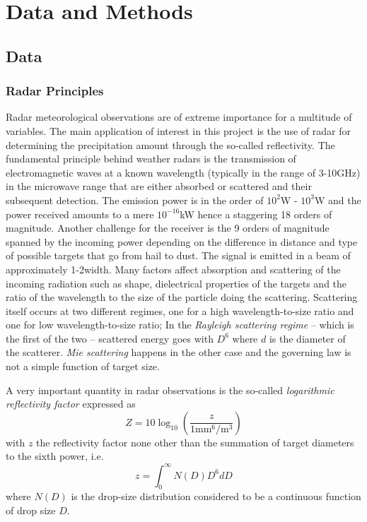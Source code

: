 \chapter{Data and Methods}\label{chap2}
\thispagestyle{plain}


\section{Data}\label{2sec:1}
\subsection{Radar Principles}
Radar meteorological observations are of extreme importance for a multitude of variables. The main application of interest in this project is the use of radar for determining the precipitation amount through the so-called reflectivity.
The fundamental principle behind weather radars is the transmission of electromagnetic waves at a known wavelength (typically in the range of 3-10GHz) in the microwave range that are either absorbed or scattered and their subsequent detection. The emission power is in the order of $10^2$W - $10^3$W and the power received amounts to a mere $10^{-16}$kW hence a staggering 18 orders of magnitude. Another challenge for the receiver is the 9 orders of magnitude spanned by the incoming power depending on the difference in distance and type of possible targets that go from hail to dust.
The signal is emitted in a beam of approximately 1-2\textdegree  width. Many factors affect absorption and scattering of the incoming radiation such as shape, dielectrical properties of the targets and the ratio of the wavelength to the size of the particle doing the scattering. Scattering itself occurs at two different regimes, one for a high wavelength-to-size ratio and one for low wavelength-to-size ratio; In the {\textit{Rayleigh scattering regime}} -- which is the first of the two -- scattered energy goes with $D^6$ where $d$ is the diameter of the scatterer. {\textit{Mie scattering}} happens in the other case and the governing law is not a simple function of target size.

A very important quantity in radar observations is the so-called \textit{logarithmic reflectivity factor} expressed as
\begin{equation}
    Z = 10 \log_{10} \left( \dfrac{z}{1 \text{mm}^6/\text{m}^3}\right)
\end{equation}
with $z$ the reflectivity factor none other than the summation of target diameters to the sixth power, i.e.
\begin{equation}
    z = \int_0^{\infty} N(D)D^6 dD
\end{equation}
where $N(D)$ is the drop-size distribution considered to be a continuous function of drop size $D$.


